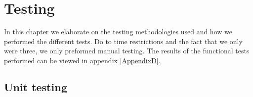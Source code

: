 
\chapter{Testing}
\label{Testing}
\nocite{SoftwareTesting}










In this chapter we elaborate on the testing methodologies used and how we performed the different tests.
Do to time restrictions and the fact that we only were three, we only preformed manual testing.
The results of the functional tests performed can be viewed in appendix \ref{AppendixD}.

\section{Unit testing}


